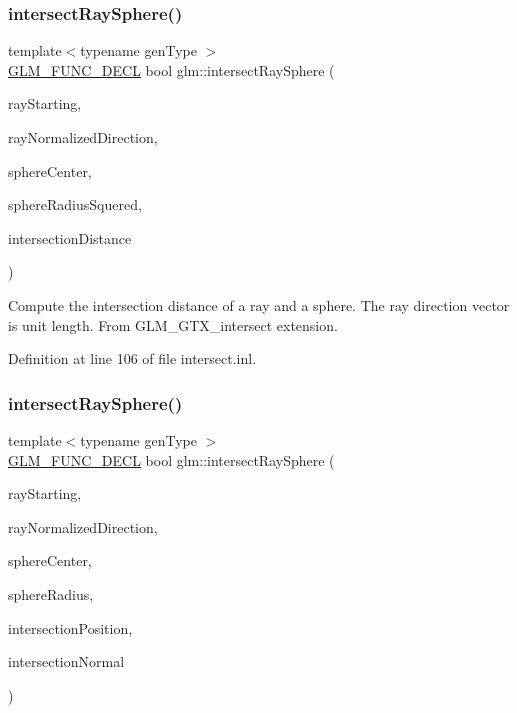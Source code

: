 \subsubsection{\texorpdfstring{intersectRaySphere()}{intersectRaySphere()}\hspace{0.1cm}{\footnotesize\ttfamily [1/2]}}
{\footnotesize\ttfamily template$<$typename gen\+Type $>$ \\
\mbox{\hyperlink{setup_8hpp_ab2d052de21a70539923e9bcbf6e83a51}{G\+L\+M\+\_\+\+F\+U\+N\+C\+\_\+\+D\+E\+CL}} bool glm\+::intersect\+Ray\+Sphere (\begin{DoxyParamCaption}\item[{gen\+Type const \&}]{ray\+Starting,  }\item[{gen\+Type const \&}]{ray\+Normalized\+Direction,  }\item[{gen\+Type const \&}]{sphere\+Center,  }\item[{typename gen\+Type\+::value\+\_\+type const}]{sphere\+Radius\+Squered,  }\item[{typename gen\+Type\+::value\+\_\+type \&}]{intersection\+Distance }\end{DoxyParamCaption})}

Compute the intersection distance of a ray and a sphere. The ray direction vector is unit length. From G\+L\+M\+\_\+\+G\+T\+X\+\_\+intersect extension. 

Definition at line 106 of file intersect.\+inl.

\mbox{\label{group__gtx__intersect_gad28c00515b823b579c608aafa1100c1d}} 
\subsubsection{\texorpdfstring{intersectRaySphere()}{intersectRaySphere()}\hspace{0.1cm}{\footnotesize\ttfamily [2/2]}}
{\footnotesize\ttfamily template$<$typename gen\+Type $>$ \\
\mbox{\hyperlink{setup_8hpp_ab2d052de21a70539923e9bcbf6e83a51}{G\+L\+M\+\_\+\+F\+U\+N\+C\+\_\+\+D\+E\+CL}} bool glm\+::intersect\+Ray\+Sphere (\begin{DoxyParamCaption}\item[{gen\+Type const \&}]{ray\+Starting,  }\item[{gen\+Type const \&}]{ray\+Normalized\+Direction,  }\item[{gen\+Type const \&}]{sphere\+Center,  }\item[{const typename gen\+Type\+::value\+\_\+type}]{sphere\+Radius,  }\item[{gen\+Type \&}]{intersection\+Position,  }\item[{gen\+Type \&}]{intersection\+Normal }\end{DoxyParamCaption})}


